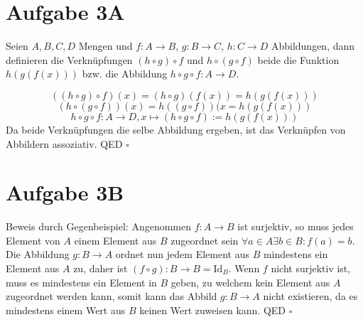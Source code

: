\documentclass[a4paper]{article}
\newcommand*{\QED}{\null\nobreak\hfill\ensuremath{\square}}%
\begin{document}
\newpage
\section{Aufgabe 3A}
Seien $A,B,C,D$ Mengen und $f: A \rightarrow B$, $g: B \rightarrow C$, $h: C \rightarrow D$ Abbildungen, dann definieren die Verknüpfungen $(h \circ g) \circ f$ und $h \circ (g \circ f)$ beide die Funktion $h(g(f(x)))$ bzw. die Abbildung $h \circ g \circ f : A \rightarrow D$.

\[ ((h \circ g) \circ f)(x) = ( h \circ g)(f(x)) = h(g(f(x))) \]
\[ (h \circ (g \circ f))(x) = h((g \circ f ))(x = h(g(f(x))) \]
\[ h \circ g \circ f : A \rightarrow D, x \mapsto (h \circ g \circ f) := h(g(f(x)))\]
\newline
Da beide Verknüpfungen die selbe Abbildung ergeben, ist das Verknüpfen von Abbildern assoziativ. QED
\newline
\QED

\section{Aufgabe 3B}
Beweis durch Gegenbeispiel: 
Angenommen $f: A \rightarrow B$ ist surjektiv, so muss jedes Element von $A$ einem Element aus $B$ zugeordnet sein $\forall a \in A \exists b \in B : f(a) = b$. Die Abbildung $g : B \rightarrow A$ ordnet nun jedem Element aus $B$ mindestens ein Element aus $A$ zu, daher ist $(f \circ g) : B \rightarrow B = \mathrm{Id}_{B}$. Wenn $f$ nicht surjektiv ist, muss es mindestens ein Element in $B$ geben, zu welchem kein Element aus $A$ zugeordnet werden kann, somit kann das Abbild $g : B \rightarrow A $ nicht existieren, da es mindestens einem Wert aus $B$ keinen Wert zuweisen kann. QED 
\newline
\QED
\end{document}
